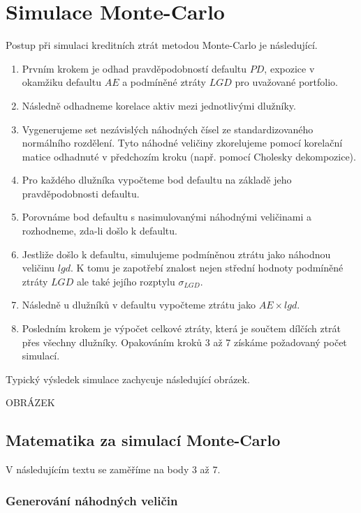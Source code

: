 \chapter{Simulace Monte-Carlo}

Postup při simulaci kreditních ztrát metodou Monte-Carlo je následující.
\begin{enumerate}
\item Prvním krokem je odhad pravděpodobností defaultu $PD$, expozice v okamžiku defaultu $AE$ a podmíněné ztráty $LGD$ pro uvažované portfolio.
\item Následně odhadneme korelace aktiv mezi jednotlivými dlužníky.
\item Vygenerujeme set nezávislých náhodných čísel ze standardizovaného normálního rozdělení. Tyto náhodné veličiny zkorelujeme pomocí korelační matice odhadnuté v předchozím kroku (např. pomocí Cholesky dekompozice).
\item Pro každého dlužníka vypočteme bod defaultu na základě jeho pravděpodobnosti defaultu.
\item Porovnáme bod defaultu s nasimulovanými náhodnými veličinami a rozhodneme, zda-li došlo k defaultu.
\item Jestliže došlo k defaultu, simulujeme podmíněnou ztrátu jako náhodnou veličinu $lgd$. K tomu je zapotřebí znalost nejen střední hodnoty podmíněné ztráty $LGD$ ale také jejího rozptylu $\sigma_{LGD}$.
\item Následně u dlužníků v defaultu vypočteme  ztrátu jako $AE \times lgd$.
\item Posledním krokem je výpočet celkové ztráty, která je součtem dílčích ztrát přes všechny dlužníky. Opakováním kroků 3 až 7 získáme požadovaný počet simulací.
\end{enumerate}
Typický výsledek simulace zachycuje následující obrázek.

OBRÁZEK

\section{Matematika za simulací Monte-Carlo}

V následujícím textu se zaměříme na body 3 až 7.

\subsection{Generování náhodných veličin}

